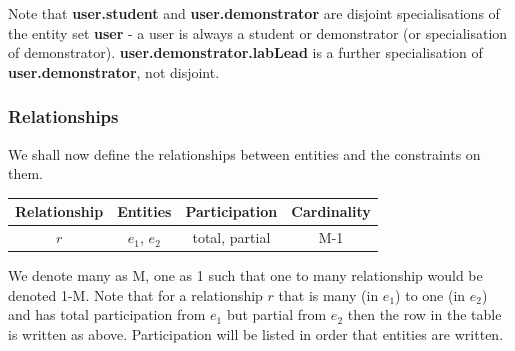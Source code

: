 Note that \textbf{user.student} and \textbf{user.demonstrator} are disjoint specialisations of the entity set \textbf{user} - a user is always a student or demonstrator (or specialisation of demonstrator). \textbf{user.demonstrator.labLead} is a further specialisation of \textbf{user.demonstrator}, not disjoint. 

\subsubsection{Relationships}
We shall now define the relationships between entities and the constraints on them. 

\FloatBarrier
\begin{table}[H]
\centering
\begin{tabular}{ |c|c|c|c| } 
 \hline
 \textbf{Relationship} & \textbf{Entities} & \textbf{Participation} & \textbf{Cardinality}\\ 
 \hline
 $r$ & $e_1$, $e_2$ & total, partial & M-1 \\
 \hline
\end{tabular}
\end{table}
\FloatBarrier 

We denote many as M, one as 1 such that one to many relationship would be denoted 1-M. Note that for a relationship $r$ that is many (in $e_1$) to one (in $e_2$) and has total participation from $e_1$ but partial from $e_2$ then the row in the table is written as above. Participation will be listed in order that entities are written.

